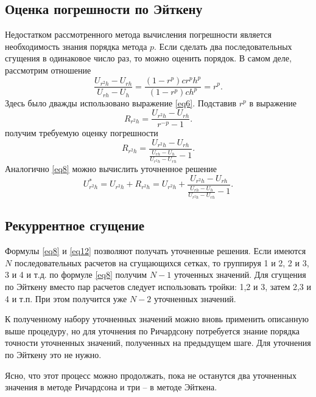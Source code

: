 \subsection{Оценка погрешности по Эйткену}
Недостатком рассмотренного метода вычисления погрешности является необходимость знания порядка метода $p$. Если сделать два последовательных сгущения в одинаковое число раз, то можно оценить порядок. В самом деле, рассмотрим отношение
\begin{equation} \label{eq9}
\frac{U_{r^2h} - U_{rh}}{U_{rh} - U_h} = \frac{\left( 1 - r^p \right) cr^ph^p}{\left( 1 - r^p \right) ch^p} = r^p.
\end{equation}
Здесь было дважды использовано выражение \eqref{eq6}. Подставив $r^p$ в выражение
\begin{equation} \label{eq10}
R_{r^2h} = \frac{U_{r^2h} - U_{rh}}{r^{-p} - 1}.
\end{equation}
получим требуемую оценку погрешности
\begin{equation} \label{eq11}
R_{r^2h} = \frac{U_{r^2h} - U_{rh}} {\frac{U_{rh} - U_h}{U_{r^2h} - U_{rh}} - 1}.
\end{equation}
Аналогично \eqref{eq8} можно вычислить уточненное решение
\begin{equation} \label{eq12}
U_{r^2h}^* = U_{r^2h} + R_{r^2h} = U_{r^2h} + \frac{U_{r^2h} - U_{rh}} {\frac{U_{rh} - U_h}{U_{r^2h} - U_{rh}} - 1}.
\end{equation}

\subsection{Рекуррентное сгущение}
Формулы \eqref{eq8} и \eqref{eq12} позволяют получать уточненные решения. Если имеются $N$ последовательных расчетов на сгущающихся сетках, то группируя 1 и 2, 2 и 3, 3 и 4 и т.д. по формуле \eqref{eq8} получим $N-1$ уточенных значений. Для сгущения по Эйткену вместо пар расчетов следует использовать тройки: 1,2 и 3, затем 2,3 и 4 и т.п. При этом получится уже $N-2$ уточненных значений. 

К полученному набору уточненных значений можно вновь применить описанную выше процедуру, но для уточнения по Ричардсону потребуется знание порядка точности уточненных значений, полученных на предыдущем шаге. Для уточнения по Эйткену это не нужно.

Ясно, что этот процесс можно продолжать, пока не останутся два уточненных значения в методе Ричардсона и три – в методе Эйткена.

